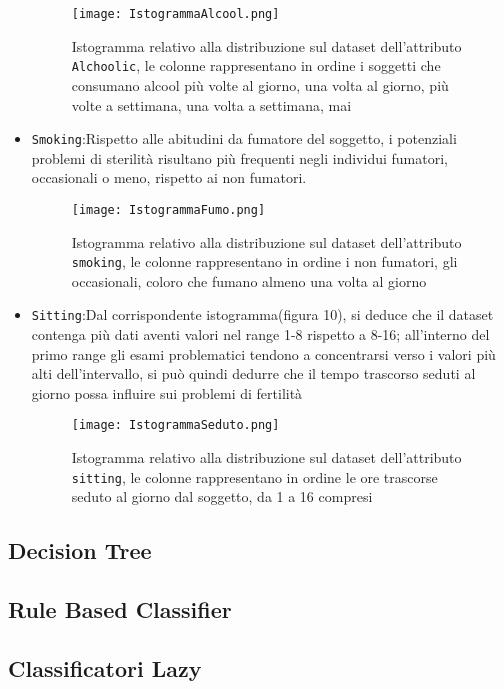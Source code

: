 \begin{itemize}
		\begin{figure}[H]
		\texttt{[image: IstogrammaAlcool.png]}
		\caption{Istogramma relativo alla distribuzione sul dataset dell'attributo \texttt{Alchoolic}, le colonne rappresentano in ordine i soggetti che consumano alcool più volte al giorno, una volta al giorno, più volte a settimana, una volta a settimana, mai}
	\end{figure}
	
	\item \texttt{Smoking}:Rispetto alle abitudini da fumatore del soggetto, i potenziali problemi di sterilità risultano più frequenti negli individui fumatori, occasionali o meno, rispetto ai non fumatori.
	
		\begin{figure}[H]
		\texttt{[image: IstogrammaFumo.png]}
		\caption{Istogramma relativo alla distribuzione sul dataset dell'attributo \texttt{smoking}, le colonne rappresentano in ordine i non fumatori, gli occasionali, coloro che fumano almeno una volta al giorno}
	\end{figure}
	
	
	\item \texttt{Sitting}:Dal corrispondente istogramma(figura 10), si deduce che il dataset contenga più dati aventi valori nel range 1-8 rispetto a 8-16; all'interno del primo range gli esami problematici tendono a concentrarsi verso i valori più alti dell'intervallo, si può quindi dedurre che il tempo trascorso seduti al giorno possa influire sui problemi di fertilità
	
		\begin{figure}[H]
		\texttt{[image: IstogrammaSeduto.png]}
		\caption{Istogramma relativo alla distribuzione sul dataset dell'attributo \texttt{sitting}, le colonne rappresentano in ordine le ore trascorse seduto al giorno dal soggetto, da 1 a 16 compresi}
	\end{figure}
	
\end{itemize} 


  
  
  \subsection{Decision Tree}
  \subsection{Rule Based Classifier}
  \subsection{Classificatori Lazy}
